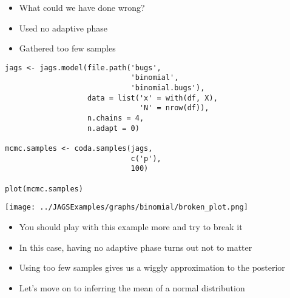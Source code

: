 \documentclass{beamer}
\begin{document}
\begin{frame}[fragile]
  \begin{itemize}
    \item{What could we have done wrong?}
    \item{Used no adaptive phase}
    \item{Gathered too few samples}
  \end{itemize}
\end{frame}

\begin{frame}[fragile]
  \begin{verbatim}
jags <- jags.model(file.path('bugs',
                             'binomial',
                             'binomial.bugs'),
                   data = list('x' = with(df, X),
                               'N' = nrow(df)),
                   n.chains = 4,
                   n.adapt = 0)
                   
mcmc.samples <- coda.samples(jags,
                             c('p'),
                             100)

plot(mcmc.samples)
  \end{verbatim}
\end{frame}

\begin{frame}[fragile]
  \begin{center}
    \texttt{[image: ../JAGSExamples/graphs/binomial/broken\_plot.png]}
  \end{center}
\end{frame}

\begin{frame}[fragile]
  \begin{itemize}
    \item{You should play with this example more and try to break it}
    \item{In this case, having no adaptive phase turns out not to matter}
    \item{Using too few samples gives us a wiggly approximation to the posterior}
  \end{itemize}
\end{frame}

\begin{frame}[fragile]
  \begin{itemize}
    \item{Let's move on to inferring the mean of a normal distribution}
  \end{itemize}
\end{frame}
\end{document}
